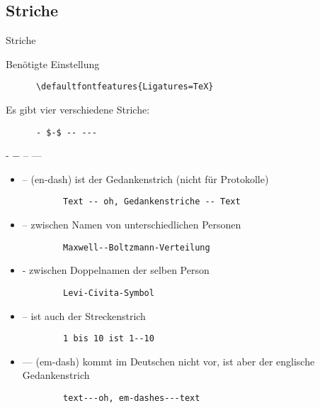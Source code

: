 \subsection{Striche}

\begin{frame}[fragile]{Striche}
  \begin{block}{Benötigte Einstellung}
    \begin{lstlisting}
      \defaultfontfeatures{Ligatures=TeX}
    \end{lstlisting}
  \end{block}
  Es gibt vier verschiedene Striche:
  \begin{CodeExample}{0.49}
    \begin{lstlisting}
      - $-$ -- ---
    \end{lstlisting}
  \CodeResult
    - $-$ -- ---
  \end{CodeExample}

  \begin{itemize}
    \item -- (en-dash) ist der Gedankenstrich (nicht für Protokolle)
      \begin{lstlisting}
        Text -- oh, Gedankenstriche -- Text
      \end{lstlisting}
    \item -- zwischen Namen von unterschiedlichen Personen
      \begin{lstlisting}
        Maxwell--Boltzmann-Verteilung
      \end{lstlisting}
    \item - zwischen Doppelnamen der selben Person
      \begin{lstlisting}
        Levi-Civita-Symbol
      \end{lstlisting}
    \item -- ist auch der Streckenstrich
      \begin{lstlisting}
        1 bis 10 ist 1--10
      \end{lstlisting}
    \item --- (em-dash) kommt im Deutschen nicht vor, ist aber der englische Gedankenstrich
      \begin{lstlisting}
        text---oh, em-dashes---text
      \end{lstlisting}
  \end{itemize}
\end{frame}

